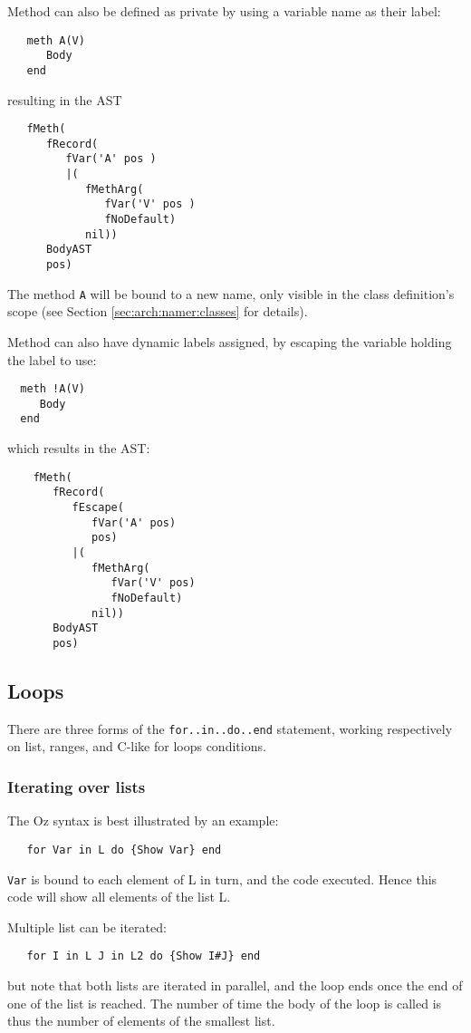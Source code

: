 \documentclass[a4paper]{memoir}
\begin{document}
Method can also be defined as private by using a variable name as their label:
\begin{lstlisting}
   meth A(V)
      Body
   end
\end{lstlisting}
resulting in the AST

\begin{lstlisting}
   fMeth(
      fRecord(
         fVar('A' pos )
         |(
            fMethArg(
               fVar('V' pos )
               fNoDefault)
            nil))
      BodyAST
      pos)
\end{lstlisting}
The method \lstinline!A! will be bound to a new name, only visible in the class
definition's scope (see Section \ref{sec:arch:namer:classes} for details).

Method can also have dynamic labels assigned, by escaping the variable holding
the label to use:
\begin{lstlisting}
  meth !A(V)
     Body
  end
\end{lstlisting}
which results in the AST:
\begin{lstlisting}
    fMeth(
       fRecord(
          fEscape(
             fVar('A' pos)
             pos)
          |(
             fMethArg(
                fVar('V' pos)
                fNoDefault)
             nil))
       BodyAST
       pos)

\end{lstlisting}

\subsection{Loops}
There are three forms of the \lstinline!for..in..do..end! statement, working
respectively on list, ranges, and C-like for loops conditions.
\subsubsection{Iterating over lists}
The Oz syntax is best illustrated by an example:
\begin{lstlisting}
   for Var in L do {Show Var} end
\end{lstlisting}
\lstinline!Var! is bound to each element of L in turn, and the code executed.
Hence this code will show all elements of the list L.

Multiple list can be iterated:
\begin{lstlisting}
   for I in L J in L2 do {Show I#J} end
\end{lstlisting}
but note that both lists are iterated in parallel, and the loop ends once the
end of one of the list is reached. The number of time the body of the loop is
called is thus the number of elements of the smallest list.
\end{document}
